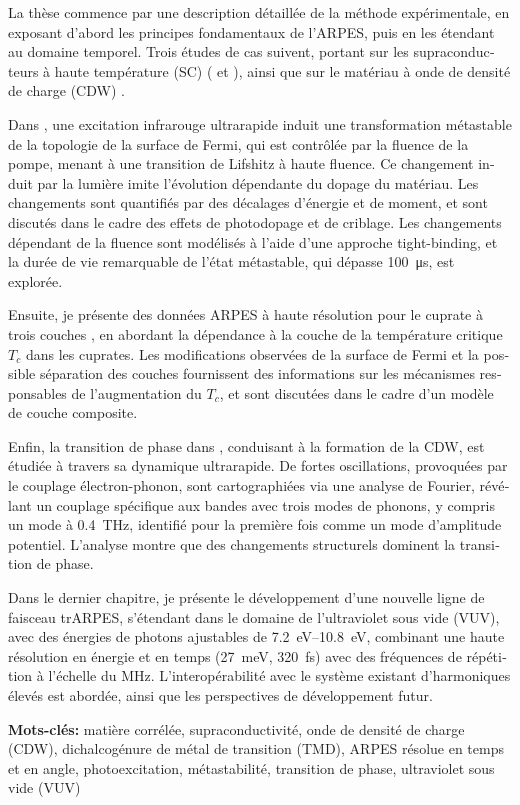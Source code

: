 \begin{otherlanguage}{french}
La thèse commence par une description détaillée de la méthode expérimentale, en exposant d'abord les principes fondamentaux de l'ARPES, puis en les étendant au domaine temporel. Trois études de cas suivent, portant sur les supraconducteurs à haute température (SC) ( et ), ainsi que sur le matériau à onde de densité de charge (CDW) .

Dans , une excitation infrarouge ultrarapide induit une transformation métastable de la topologie de la surface de Fermi, qui est contrôlée par la fluence de la pompe, menant à une transition de Lifshitz à haute fluence. Ce changement induit par la lumière imite l'évolution dépendante du dopage du matériau. Les changements sont quantifiés par des décalages d’énergie et de moment, et sont discutés dans le cadre des effets de photodopage et de criblage. Les changements dépendant de la fluence sont modélisés à l’aide d’une approche tight-binding, et la durée de vie remarquable de l’état métastable, qui dépasse \qty{100}{\micro\second}, est explorée.

Ensuite, je présente des données ARPES à haute résolution pour le cuprate à trois couches , en abordant la dépendance à la couche de la température critique $T_c$ dans les cuprates. Les modifications observées de la surface de Fermi et la possible séparation des couches fournissent des informations sur les mécanismes responsables de l’augmentation du $T_c$, et sont discutées dans le cadre d’un modèle de couche composite.

Enfin, la transition de phase dans , conduisant à la formation de la CDW, est étudiée à travers sa dynamique ultrarapide. De fortes oscillations, provoquées par le couplage électron-phonon, sont cartographiées via une analyse de Fourier, révélant un couplage spécifique aux bandes avec trois modes de phonons, y compris un mode à \qty{0.4}{\tera\hertz}, identifié pour la première fois comme un mode d’amplitude potentiel. L’analyse montre que des changements structurels dominent la transition de phase.

Dans le dernier chapitre, je présente le développement d’une nouvelle ligne de faisceau trARPES, s'étendant dans le domaine de l’ultraviolet sous vide (VUV), avec des énergies de photons ajustables de \qtyrange{7.2}{10.8}{\electronvolt}, combinant une haute résolution en énergie et en temps (\qty{27}{\milli\electronvolt}, \qty{320}{\femto\second}) avec des fréquences de répétition à l’échelle du \unit{\mega\hertz}. L’interopérabilité avec le système existant d’harmoniques élevés est abordée, ainsi que les perspectives de développement futur. \hfill\break

\textbf{Mots-clés:} matière corrélée, supraconductivité, onde de densité de charge (CDW), dichalcogénure de métal de transition (TMD), ARPES résolue en temps et en angle, photoexcitation, métastabilité, transition de phase, ultraviolet sous vide (VUV)
\end{otherlanguage}


